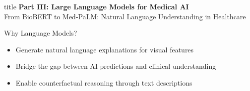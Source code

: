 \documentclass[aspectratio=169]{beamer}
\begin{document}
\begin{frame}[plain]
    \centering
    \vfill
    \begin{beamercolorbox}[center,shadow=true,rounded=true]{title}
        \textbf{Part III: Large Language Models for Medical AI}\\
        \vspace{0.5em}
        \large From BioBERT to Med-PaLM: Natural Language Understanding in Healthcare
    \end{beamercolorbox}
    \vfill
    
    \vspace{1em}
    \normalsize
    \begin{block}{Why Language Models?}
        \begin{itemize}
            \item Generate natural language explanations for visual features
            \item Bridge the gap between AI predictions and clinical understanding
            \item Enable counterfactual reasoning through text descriptions
        \end{itemize}
    \end{block}
\end{frame}
\end{document}
